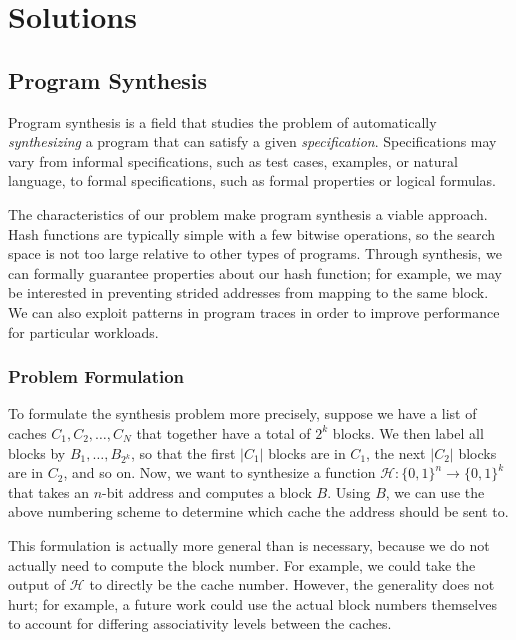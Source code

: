 \section{Solutions}
\label{sec:Solution}

\subsection{Program Synthesis}

Program synthesis \cite{program-synthesis-survey} is a field that studies the
problem of automatically \textit{synthesizing} a program that can satisfy a
given \textit{specification}. Specifications may vary from informal
specifications, such as test cases, examples, or natural language, to formal
specifications, such as formal properties or logical formulas.

The characteristics of our problem make program synthesis a viable approach.
Hash functions are typically simple with a few bitwise operations, so the search
space is not too large relative to other types of programs. Through synthesis,
we can formally guarantee properties about our hash function; for example, we
may be interested in preventing strided addresses from mapping to the same
block. We can also exploit patterns in program traces in order to improve
performance for particular workloads.

\subsubsection{Problem Formulation}

To formulate the synthesis problem more precisely, suppose we have a list of
caches $C_1, C_2, \dots, C_N$ that together have a total of $2^k$ blocks. We
then label all blocks by $B_1, \dots, B_{2^k}$, so that the first $|C_1|$ blocks
are in $C_1$, the next $|C_2|$ blocks are in $C_2$, and so on. Now, we want to
synthesize a function $\mathcal{H} : \{0,1\}^n \to \{0,1\}^k$ that takes an $n$-bit
address and computes a block $B$. Using $B$, we can use the above numbering
scheme to determine which cache the address should be sent to.

This formulation is actually more general than is necessary, because we do not
actually need to compute the block number. For example, we could take the output
of $\mathcal{H}$ to directly be the cache number. However, the generality does
not hurt; for example, a future work could use the actual block numbers
themselves to account for differing associativity levels between the caches.

